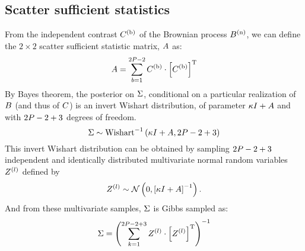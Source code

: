 \subsection{Scatter sufficient statistics}
From the independent contrast $C^{(\text{b})}$ of the Brownian process $B^{(\text{n})}$, we can define the $2 \times 2$ scatter sufficient statistic matrix, $A$ as:
\begin{equation}
    A = \sum\limits_{b=1}^{2 P - 2} C^{(\text{b})} \cdot \left[C^{(\text{b})}\right]^{\text{T}}
\end{equation}
By Bayes theorem, the posterior on $\Sigma$, conditional on a particular realization of $B$ (and thus of $C$) is an invert Wishart distribution, of parameter $\kappa I + A$ and with $2 P - 2 + 3$ degrees of freedom.
\begin{equation}
    \Sigma \sim \text{Wishart}^{-1}\left( \kappa I + A, 2 P - 2 + 3\right)
\end{equation}
This invert Wishart distribution can be obtained by sampling $2 P - 2 + 3$ independent and identically distributed multivariate normal random variables $Z^{(l)}$ defined by
\begin{equation}
    Z^{(l)} \sim \mathcal{N} \left( 0, \left[\kappa I + A\right]^{-1} \right).
\end{equation}
And from these multivariate samples, $\Sigma$ is Gibbs sampled as:
\begin{equation}
    \Sigma = \left( \sum\limits_{k=1}^{2 P - 2 + 3} Z^{(l)} \cdot \left[Z^{(l)} \right] ^{\text{T}} \right)^{-1}
\end{equation}

